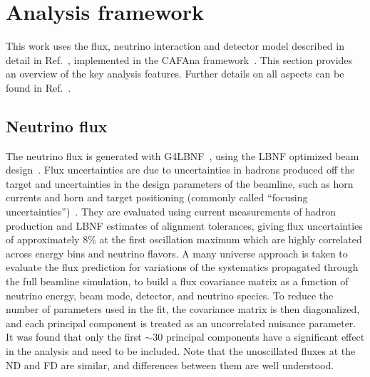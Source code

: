 \section{Analysis framework}
\label{sec:analysis_framework}
This work uses the flux, neutrino interaction and detector model described in detail in Ref.~\cite{Abi:2020qib}, implemented in the CAFAna framework~\cite{CAFAna}. This section provides an overview of the key analysis features. Further details on all aspects can be found in Ref.~\cite{Abi:2020qib}.

\subsection{Neutrino flux}
The neutrino flux is generated with G4LBNF~\cite{Aliaga:2016oaz,Abi:2020evt}, using the LBNF optimized beam design~\cite{Abi:2020evt}. Flux uncertainties are due to uncertainties in hadrons produced off the target and uncertainties in the design parameters of the beamline, such as horn currents and horn and target positioning (commonly called ``focusing uncertainties'')~\cite{Abi:2020evt}. They are evaluated using current measurements of hadron production and LBNF estimates of alignment tolerances, giving flux uncertainties of approximately 8\% at the first oscillation maximum which are highly correlated across energy bins and neutrino flavors. A many universe approach is taken to evaluate the flux prediction for variations of the systematics propagated through the full beamline simulation, to build a flux covariance matrix as a function of neutrino energy, beam mode, detector, and neutrino species. To reduce the number of parameters used in the fit, the covariance matrix is then diagonalized, and each principal component is treated as an uncorrelated nuisance parameter. It was found that only the first $\sim$30 principal components have a significant effect in the analysis and need to be included. Note that the unoscillated fluxes at the ND and FD are similar, and differences between them are well understood.

